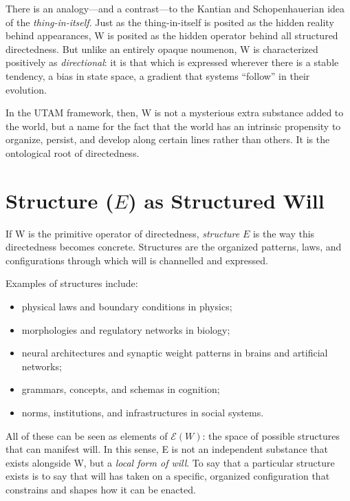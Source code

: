 \documentclass[12pt,a4paper]{report}
\newcommand{\Will}{W}
\newcommand{\Struct}{E}
\begin{document}
There is an analogy---and a contrast---to the Kantian and Schopenhauerian idea of the \emph{thing-in-itself}. Just as the thing-in-itself is posited as the hidden reality behind appearances, \Will{} is posited as the hidden operator behind all structured directedness. But unlike an entirely opaque noumenon, \Will{} is characterized positively as \emph{directional}: it is that which is expressed wherever there is a stable tendency, a bias in state space, a gradient that systems ``follow'' in their evolution.

In the UTAM framework, then, \Will{} is not a mysterious extra substance added to the world, but a name for the fact that the world has an intrinsic propensity to organize, persist, and develop along certain lines rather than others. It is the ontological root of directedness.

\section{Structure (\(E\)) as Structured Will}

If \Will{} is the primitive operator of directedness, \emph{structure} \(\Struct\) is the way this directedness becomes concrete. Structures are the organized patterns, laws, and configurations through which will is channelled and expressed.

Examples of structures include:

\begin{itemize}[leftmargin=2em]
    \item physical laws and boundary conditions in physics;
    \item morphologies and regulatory networks in biology;
    \item neural architectures and synaptic weight patterns in brains and artificial networks;
    \item grammars, concepts, and schemas in cognition;
    \item norms, institutions, and infrastructures in social systems.
\end{itemize}

All of these can be seen as elements of \(\mathcal{E}(\Will)\): the space of possible structures that can manifest will. In this sense, \Struct{} is not an independent substance that exists alongside \Will{}, but a \emph{local form of will}. To say that a particular structure exists is to say that will has taken on a specific, organized configuration that constrains and shapes how it can be enacted.
\end{document}
